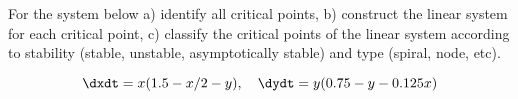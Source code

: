 \documentclass[12pt]{exam}
\begin{document}
\begin{questions}
    

    \question
    For the system below a) identify all critical points, b) construct the linear system for each critical point, c) classify the critical points of the linear system according to stability (stable, unstable, asymptotically stable) and type (spiral, node, etc).

    $$\displaystyle \dxdt = x(1.5-x/2-y), \quad \dydt = y(0.75-y-0.125x)$$
    

    
\end{questions}

\newcommand{\LTNUM}{\stepcounter{NumberInTable}{\theNumberInTable.}}
\end{document}
